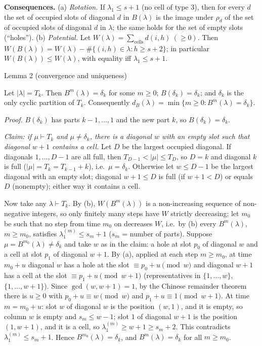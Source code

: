 \documentclass[11pt,a4paper]{article}
\begin{document}
\textbf{Consequences.} (a) \emph{Rotation.} If \(\lambda_1\le s+1\) (no
cell of type 3), then for every \(d\) the set of occupied slots of
diagonal \(d\) in \(B(\lambda)\) is the image under \(\rho_d\) of the
set of occupied slots of diagonal \(d\) in \(\lambda\); the same holds
for the set of empty slots (``holes''). (b) \emph{Potential.} Let
\(W(\lambda)=\sum_{\text{cells}}d(i,h)\ (\ge 0)\). Then
\(W(B(\lambda))=W(\lambda)-\#\{(i,h)\in\lambda:h\ge s+2\}\); in
particular \(W(B(\lambda))\le W(\lambda)\), with equality iff
\(\lambda_1\le s+1\).

Lemma 2 (convergence and uniqueness)

Let \(|\lambda|=T_k\). Then \(B^m(\lambda)=\delta_k\) for some
\(m\ge0\); \(B(\delta_k)=\delta_k\); and \(\delta_k\) is the only cyclic
partition of \(T_k\). Consequently
\(d_B(\lambda)=\min\{m\ge0:B^m(\lambda)=\delta_k\}\).

\emph{Proof.} \(B(\delta_k)\) has parts \(k-1,\dots,1\) and the new part
\(k\), so \(B(\delta_k)=\delta_k\).

\emph{Claim: if \(\mu\vdash T_k\) and \(\mu\ne\delta_k\), there is a
diagonal \(w\) with an empty slot such that diagonal \(w+1\) contains a
cell.} Let \(D\) be the largest occupied diagonal. If diagonals
\(1,\dots,D-1\) are all full, then \(T_{D-1}<|\mu|\le T_D\), so \(D=k\)
and diagonal \(k\) is full (\(|\mu|=T_k=T_{k-1}+k\)),
i.e.~\(\mu=\delta_k\). Otherwise let \(w\le D-1\) be the largest
diagonal with an empty slot; diagonal \(w+1\le D\) is full (if
\(w+1<D\)) or equals \(D\) (nonempty); either way it contains a cell.

Now take any \(\lambda\vdash T_k\). By (b), \(W(B^m(\lambda))\) is a
non-increasing sequence of non-negative integers, so only finitely many
steps have \(W\) strictly decreasing; let \(m_0\) be such that no step
from time \(m_0\) on decreases \(W\), i.e.~by (b) every
\(B^m(\lambda)\), \(m\ge m_0\), satisfies \(\lambda^{(m)}_1\le s_m+1\)
(\(s_m\) = number of parts). Suppose \(\mu=B^{m_0}(\lambda)\ne\delta_k\)
and take \(w\) as in the claim: a hole at slot \(p_0\) of diagonal \(w\)
and a cell at slot \(p_1\) of diagonal \(w+1\). By (a), applied at each
step \(m\ge m_0\), at time \(m_0+u\) diagonal \(w\) has a hole at the
slot \(\equiv p_0+u\pmod w\) and diagonal \(w+1\) has a cell at the slot
\(\equiv p_1+u\pmod{w+1}\) (representatives in \(\{1,\dots,w\}\),
\(\{1,\dots,w+1\}\)). Since \(\gcd(w,w+1)=1\), by the Chinese remainder
theorem there is \(u\ge0\) with \(p_0+u\equiv w\pmod w\) and
\(p_1+u\equiv1\pmod{w+1}\). At time \(m=m_0+u\): slot \(w\) of diagonal
\(w\) is the position \((w,1)\), and it is empty, so column \(w\) is
empty and \(s_m\le w-1\); slot \(1\) of diagonal \(w+1\) is the position
\((1,w+1)\), and it is a cell, so \(\lambda^{(m)}_1\ge w+1\ge s_m+2\).
This contradicts \(\lambda^{(m)}_1\le s_m+1\). Hence
\(B^{m_0}(\lambda)=\delta_k\), and \(B^m(\lambda)=\delta_k\) for all
\(m\ge m_0\).
\end{document}
